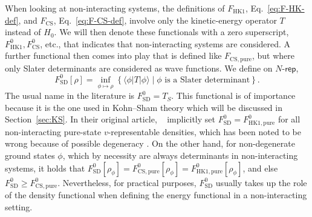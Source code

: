 \documentclass[journal=apcach,manuscript=article,layout=twocolumn]{achemso}
\newcommand{\FHK}{F_\mathrm{HK1}}
\newcommand{\FHKpure}{F_\mathrm{HK1,pure}}
\newcommand{\FSD}{F^0_\mathrm{SD}}
\newcommand{\FCS}{F_\mathrm{CS}}
\newcommand{\FCSpure}{F_\mathrm{CS,pure}}
\newcommand{\Nrep}{\ensuremath{N\text{-}\mathsf{rep}}}
\begin{document}
When looking at non-interacting systems, the definitions of $\FHK$, Eq.~\eqref{eq:F-HK-def}, and $\FCS$, Eq.~\eqref{eq:F-CS-def}, involve only the kinetic-energy operator $T$ instead of $H_0$. We will then denote these functionals with a zero superscript, $\FHK^0, \FCS^0$, etc., that indicates that non-interacting systems are considered. A further functional then comes into play that is defined like $\FCSpure$, but where only Slater determinants are considered as wave functions. 
We define on $\Nrep$,
\begin{equation*}%
    \FSD[\rho] = \inf_{\phi \mapsto \rho}\left\{ \langle \phi | T | \phi  \rangle \mid \text{$\phi$ is a Slater determinant} \right\}.
\end{equation*}
The usual name in the literature is $\FSD = T_S$.
This functional is of importance because it is the one used in Kohn--Sham theory which will be discussed in Section~\ref{sec:KS}. 
In their original article, \citeauthor{KS1965}~\cite{KS1965} implicitly set $\FSD=\FHKpure^0$ for all non-interacting pure-state $v$-representable densities, which has been noted to be wrong because of possible degeneracy \cite[Section~4.C]{Lieb1983}. On the other hand, for non-degenerate ground states $\phi$, which by necessity are always determinants in non-interacting systems, it holds that $\FSD[\rho_\phi]= \FCSpure^0[\rho_\phi]= \FHKpure^0[\rho_\phi]$, and else $\FSD\geq \FCSpure^0$. Nevertheless, for practical purposes, $\FSD$ usually takes up the role of the density functional when defining the energy functional in a non-interacting setting.
\end{document}
